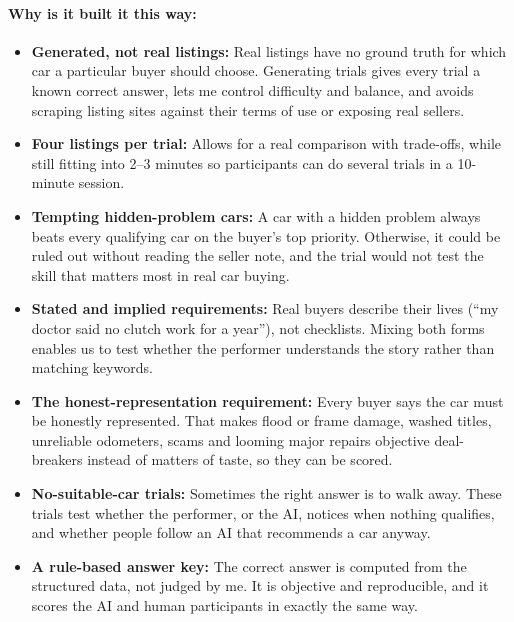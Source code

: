 \documentclass[11pt]{article}
\begin{document}
\paragraph{Why is it built it this way:}
\begin{itemize}
  \item \textbf{Generated, not real listings:} Real listings have no ground truth for which car a
  particular buyer should choose. Generating trials gives every trial a known correct answer, lets
  me control difficulty and balance, and avoids scraping listing sites against their terms of use
  or exposing real sellers.
  \item \textbf{Four listings per trial:} Allows for a real comparison with trade-offs, while still
  fitting into 2--3 minutes so participants can do several trials in a 10-minute session.
  \item \textbf{Tempting hidden-problem cars:} A car with a hidden problem always beats every
  qualifying car on the buyer's top priority. Otherwise, it could be ruled out without reading the
  seller note, and the trial would not test the skill that matters most in real car buying.
  \item \textbf{Stated and implied requirements:} Real buyers describe their lives (``my doctor said
  no clutch work for a year''), not checklists. Mixing both forms enables us to test whether the performer
  understands the story rather than matching keywords.
  \item \textbf{The honest-representation requirement:} Every buyer says the car must be honestly
  represented. That makes flood or frame damage, washed titles, unreliable odometers, scams and
  looming major repairs objective deal-breakers instead of matters of taste, so they can be scored.
  \item \textbf{No-suitable-car trials:} Sometimes the right answer is to walk away. These trials
  test whether the performer, or the AI, notices when nothing qualifies, and whether people follow
  an AI that recommends a car anyway.
  \item \textbf{A rule-based answer key:} The correct answer is computed from the structured data,
  not judged by me. It is objective and reproducible, and it scores the AI and human participants
  in exactly the same way.
\end{itemize}
\end{document}
